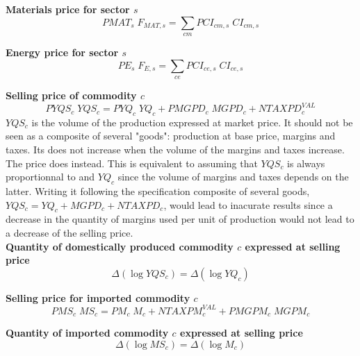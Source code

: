 \documentclass[12pt]{article}
\numberwithin{equation}{section}
\begin{document}
\noindent\textbf{Materials price for sector $s$} \\
\begin{dmath}
PMAT_{s} \; F_{MAT, s} = \sum_{cm} PCI_{cm, s} \; CI_{cm, s}
\end{dmath}

\noindent\textbf{Energy price for sector $s$} \\
\begin{dmath}
PE_{s} \; F_{E, s} = \sum_{ce} PCI_{ce, s} \; CI_{ce, s}
\end{dmath}



\noindent\textbf{Selling price of commodity $c$} \\
\begin{dmath}
PYQS_{c} \; YQS_{c} = PYQ_{c} \; YQ_{c} + PMGPD_{c} \; MGPD_{c} + NTAXPD^{VAL}_{c}
\end{dmath}
$YQS_{c}$ is the volume of the production expressed at market price. It should not be seen as a composite of several "goods": production at base price, margins and taxes. Its does not increase when the volume of the margins and taxes increase. The price does instead. This is equivalent to assuming that $YQS_{c}$ is always proportionnal to and $YQ_{c}$ since the volume of margins and taxes depends on the latter. Writing it following the specification composite of several goods, $YQS_{c} = YQ_{c} + MGPD_{c} + NTAXPD_{c}$, would lead to inacurate results since a decrease in the quantity of margins used per unit of production would not lead to a decrease of the selling price. \\

\noindent\textbf{Quantity of domestically produced commodity $c$ expressed at selling price} \\
\begin{dmath}
\varDelta \left(\operatorname{log} YQS_{c}\right) = \varDelta \left(\operatorname{log} YQ_{c}\right)
\end{dmath}

\noindent\textbf{Selling price for imported commodity $c$} \\
\begin{dmath}
PMS_{c} \; MS_{c} = PM_{c} \; M_{c} + NTAXPM^{VAL}_{c} + PMGPM_{c} \; MGPM_{c}
\end{dmath}

\noindent\textbf{Quantity of imported commodity $c$ expressed at selling price} \\
\begin{dmath}
\varDelta \left(\operatorname{log} MS_{c}\right) = \varDelta \left(\operatorname{log} M_{c}\right)
\end{dmath}
\end{document}

